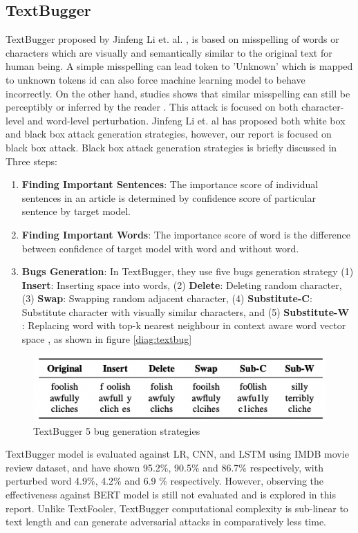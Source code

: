 \documentclass[%
	BCOR=8mm, %
	DIV=12, 
	toc=bibliography, %
	toc=listof, %
	oneside, %
	egregdoesnotlikesansseriftitles, %
	]{scrbook}
\begin{document}
\subsection{TextBugger}
TextBugger  proposed by Jinfeng Li et$.$ al$.$ \cite{li_textbugger_2019}, is based on misspelling of words or characters which are visually and semantically similar to the original text for human being. A simple misspelling can lead token to 'Unknown'  which is mapped to unknown tokens id can also force machine learning model to behave incorrectly. On the other hand, studies shows that similar misspelling can still be perceptibly or inferred by the reader \cite{rawlinson_significance_2007,alzantot_generating_2018}  . This attack is focused on both character-level and word-level perturbation. Jinfeng Li et. al has proposed both white box and black box attack generation strategies, however, our report is focused on black box attack. Black box attack generation strategies is briefly discussed in Three steps:
\begin{enumerate}
\item \textbf{Finding Important Sentences}: The importance score of individual sentences in an article is determined by confidence score of particular sentence by target model. 
\item \textbf{Finding Important Words}: The importance score of word is the difference between confidence of target model with word and without word. 
\item \textbf{Bugs Generation}: In TextBugger, they use five bugs generation strategy (1) \textbf{Insert}: Inserting space into words, (2) \textbf{Delete}: Deleting random character, (3) \textbf{Swap}: Swapping random adjacent character, (4) \textbf{Substitute-C}: Substitute character with visually similar characters, and (5)\textbf{ Substitute-W} : Replacing word with top-k nearest neighbour in context aware word vector space , as shown in figure \ref{diag:textbug} 
\end{enumerate}
\begin{figure}[h!]
\centering
\includegraphics[width=.8\textwidth]{img/textbugger_5strat.png}
\caption{TextBugger 5 bug generation strategies \cite{li_textbugger_2019} }
\label{diag:textbug5}
\end{figure}
    TextBugger model is evaluated against LR, CNN, and LSTM  using IMDB movie review dataset, and have shown 95.2\%, 90.5\% and 86.7\% respectively, with perturbed word 4.9\%, 4.2\% and 6.9 \% respectively. However, observing the effectiveness against BERT model is still not evaluated and is explored in this report. 
 Unlike TextFooler, TextBugger computational complexity is sub-linear to text length and can generate adversarial attacks in comparatively less time. 
\end{document}
